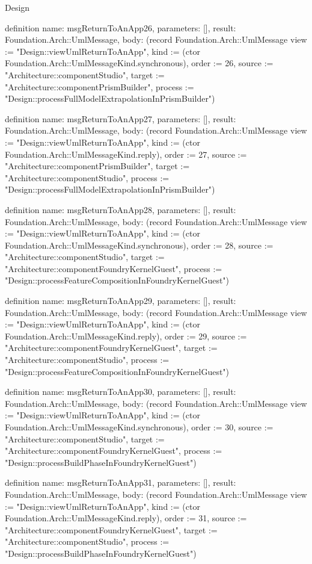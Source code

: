 \begin{lexlean}{Design}
\begin{semanticmodule}
definition{
  name: msgReturnToAnApp26,
  parameters: [],
  result: Foundation.Arch::UmlMessage,
  body: (record Foundation.Arch::UmlMessage {view := "Design::viewUmlReturnToAnApp", kind := (ctor Foundation.Arch::UmlMessageKind.synchronous), order := 26, source := "Architecture::componentStudio", target := "Architecture::componentPrismBuilder", process := "Design::processFullModelExtrapolationInPrismBuilder"})
}

definition{
  name: msgReturnToAnApp27,
  parameters: [],
  result: Foundation.Arch::UmlMessage,
  body: (record Foundation.Arch::UmlMessage {view := "Design::viewUmlReturnToAnApp", kind := (ctor Foundation.Arch::UmlMessageKind.reply), order := 27, source := "Architecture::componentPrismBuilder", target := "Architecture::componentStudio", process := "Design::processFullModelExtrapolationInPrismBuilder"})
}

definition{
  name: msgReturnToAnApp28,
  parameters: [],
  result: Foundation.Arch::UmlMessage,
  body: (record Foundation.Arch::UmlMessage {view := "Design::viewUmlReturnToAnApp", kind := (ctor Foundation.Arch::UmlMessageKind.synchronous), order := 28, source := "Architecture::componentStudio", target := "Architecture::componentFoundryKernelGuest", process := "Design::processFeatureCompositionInFoundryKernelGuest"})
}

definition{
  name: msgReturnToAnApp29,
  parameters: [],
  result: Foundation.Arch::UmlMessage,
  body: (record Foundation.Arch::UmlMessage {view := "Design::viewUmlReturnToAnApp", kind := (ctor Foundation.Arch::UmlMessageKind.reply), order := 29, source := "Architecture::componentFoundryKernelGuest", target := "Architecture::componentStudio", process := "Design::processFeatureCompositionInFoundryKernelGuest"})
}

definition{
  name: msgReturnToAnApp30,
  parameters: [],
  result: Foundation.Arch::UmlMessage,
  body: (record Foundation.Arch::UmlMessage {view := "Design::viewUmlReturnToAnApp", kind := (ctor Foundation.Arch::UmlMessageKind.synchronous), order := 30, source := "Architecture::componentStudio", target := "Architecture::componentFoundryKernelGuest", process := "Design::processBuildPhaseInFoundryKernelGuest"})
}

definition{
  name: msgReturnToAnApp31,
  parameters: [],
  result: Foundation.Arch::UmlMessage,
  body: (record Foundation.Arch::UmlMessage {view := "Design::viewUmlReturnToAnApp", kind := (ctor Foundation.Arch::UmlMessageKind.reply), order := 31, source := "Architecture::componentFoundryKernelGuest", target := "Architecture::componentStudio", process := "Design::processBuildPhaseInFoundryKernelGuest"})
}


\end{semanticmodule}
\end{lexlean}

